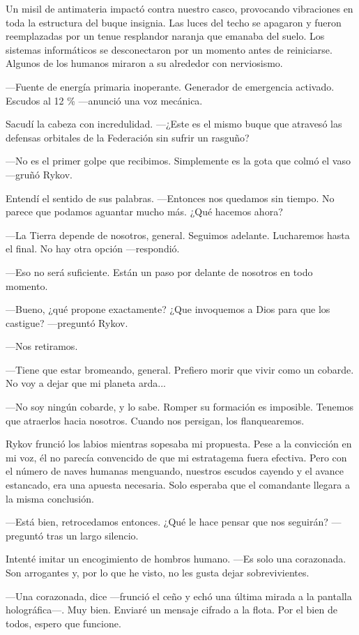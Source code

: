 Un misil de antimateria impactó contra nuestro casco, provocando vibraciones en toda la estructura del buque insignia. Las luces del techo se apagaron y fueron reemplazadas por un tenue resplandor naranja que emanaba del suelo. Los sistemas informáticos se desconectaron por un momento antes de reiniciarse. Algunos de los humanos miraron a su alrededor con nerviosismo.

—Fuente de energía primaria inoperante. Generador de emergencia activado. Escudos al 12 \% —anunció una voz mecánica.

Sacudí la cabeza con incredulidad. —¿Este es el mismo buque que atravesó las defensas orbitales de la Federación sin sufrir un rasguño?

—No es el primer golpe que recibimos. Simplemente es la gota que colmó el vaso —gruñó Rykov.

Entendí el sentido de sus palabras. —Entonces nos quedamos sin tiempo. No parece que podamos aguantar mucho más. ¿Qué hacemos ahora?

—La Tierra depende de nosotros, general. Seguimos adelante. Lucharemos hasta el final. No hay otra opción —respondió.

—Eso no será suficiente. Están un paso por delante de nosotros en todo momento.

—Bueno, ¿qué propone exactamente? ¿Que invoquemos a Dios para que los castigue? —preguntó Rykov.

—Nos retiramos.

—Tiene que estar bromeando, general. Prefiero morir que vivir como un cobarde. No voy a dejar que mi planeta arda...

—No soy ningún cobarde, y lo sabe. Romper su formación es imposible. Tenemos que atraerlos hacia nosotros. Cuando nos persigan, los flanquearemos.

Rykov frunció los labios mientras sopesaba mi propuesta. Pese a la convicción en mi voz, él no parecía convencido de que mi estratagema fuera efectiva. Pero con el número de naves humanas menguando, nuestros escudos cayendo y el avance estancado, era una apuesta necesaria. Solo esperaba que el comandante llegara a la misma conclusión.

—Está bien, retrocedamos entonces. ¿Qué le hace pensar que nos seguirán? —preguntó tras un largo silencio.

Intenté imitar un encogimiento de hombros humano. —Es solo una corazonada. Son arrogantes y, por lo que he visto, no les gusta dejar sobrevivientes.

—Una corazonada, dice —frunció el ceño y echó una última mirada a la pantalla holográfica—. Muy bien. Enviaré un mensaje cifrado a la flota. Por el bien de todos, espero que funcione.


